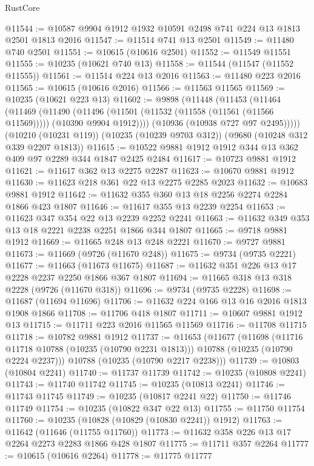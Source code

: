 \begin{lexlean}{RustCore}
\begin{coremodule}
@11544 := @10587 @9904 @1912 @1932 @10591 @2498 @741 @224 @13 @1813 @2501 @1813 @2016
@11547 := @11514 @741 @13 @2501
@11549 := @11480 @740 @2501
@11551 := @10615 (@10616 @2501)
@11552 := @11549 @11551
@11555 := @10235 (@10621 @740 @13)
@11558 := @11544 (@11547 (@11552 @11555))
@11561 := @11514 @224 @13 @2016
@11563 := @11480 @223 @2016
@11565 := @10615 (@10616 @2016)
@11566 := @11563 @11565
@11569 := @10235 (@10621 @223 @13)
@11602 := @9898
    (@11448
      (@11453
        (@11464
          (@11469
            (@11490
              (@11496 (@11501 (@11532 (@11558 (@11561 (@11566 @11569))))) (@10390 @9904 @1912))))
          (@10936 (@10938 @727 @97 @2495)))))
    (@10210 (@10231 @119))
    (@10235 (@10239 @9703 @312))
    (@9680 (@10248 @312 @339 @2207 @1813))
@11615 := @10522 @9881 @1912 @1912 @344 @13 @362 @409 @97 @2289 @344 @1847 @2425 @2484
@11617 := @10723 @9881 @1912
@11621 := @11617 @362 @13 @2275 @2287
@11623 := @10670 @9881 @1912
@11630 := @11623 @218 @361 @22 @13 @2275 @2285 @2023
@11632 := @10683 @9881 @1912
@11642 := @11632 @355 @360 @13 @18 @2256 @2274 @2284 @1866 @423 @1807
@11646 := @11617 @355 @13 @2239 @2254
@11653 := @11623 @347 @354 @22 @13 @2239 @2252 @2241
@11663 := @11632 @349 @353 @13 @18 @2221 @2238 @2251 @1866 @344 @1807
@11665 := @9718 @9881 @1912
@11669 := @11665 @248 @13 @248 @2221
@11670 := @9727 @9881
@11673 := @11669 (@9726 (@11670 @248))
@11675 := @9734 (@9735 @2221)
@11677 := @11663 (@11673 @11675)
@11687 := @11632 @351 @226 @13 @17 @2228 @2237 @2250 @1866 @367 @1807
@11694 := @11665 @318 @13 @318 @2228 (@9726 (@11670 @318))
@11696 := @9734 (@9735 @2228)
@11698 := @11687 (@11694 @11696)
@11706 := @11632 @224 @166 @13 @16 @2016 @1813 @1908 @1866
@11708 := @11706 @418 @1807
@11711 := @10607 @9881 @1912 @13
@11715 := @11711 @223 @2016 @11565 @11569
@11716 := @11708 @11715
@11718 := @10782 @9881 @1912
@11737 := @11653
    (@11677
      (@11698
        (@11716 @11718 @10788 (@10235 (@10790 @2231 @1813)))
        @10788
        (@10235 (@10790 @2224 @2237)))
      @10788
      (@10235 (@10790 @2217 @2238)))
@11739 := @10803 (@10804 @2241)
@11740 := @11737 @11739
@11742 := @10235 (@10808 @2241)
@11743 := @11740 @11742
@11745 := @10235 (@10813 @2241)
@11746 := @11743 @11745
@11749 := @10235 (@10817 @2241 @22)
@11750 := @11746 @11749
@11754 := @10235 (@10822 @347 @22 @13)
@11755 := @11750 @11754
@11760 := @10235 (@10828 (@10829 (@10830 @2241)) @1912)
@11763 := @11642 (@11646 (@11755 @11760))
@11773 := @11632 @358 @226 @13 @17 @2264 @2273 @2283 @1866 @428 @1807
@11775 := @11711 @357 @2264
@11777 := @10615 (@10616 @2264)
@11778 := @11775 @11777

\end{coremodule}
\end{lexlean}
